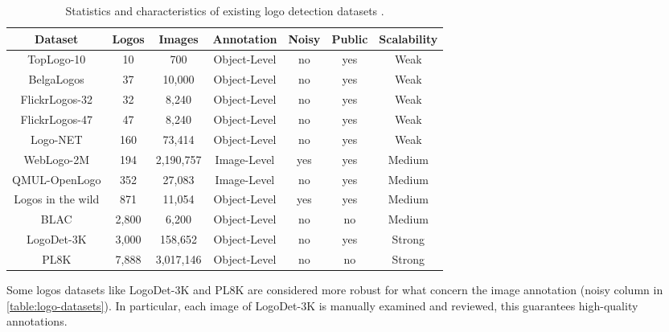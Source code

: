 \begin{table}
    \begin{center}
        \begin{tabular}{c || c | c | c | c | c |c} 
            \hline
            \textbf{Dataset} & \textbf{Logos} & \textbf{Images} & \textbf{Annotation} & \textbf{Noisy} & \textbf{Public} & \textbf{Scalability} \\
            \hline
            \hline
            TopLogo-10 \cite{su2017deep} & 10 & 700 & Object-Level & no & yes & Weak \\ 
       \hline
           BelgaLogos \cite{joly2009logo} & 37 & 10,000 & Object-Level & no & yes & Weak \\ 
       \hline
           FlickrLogos-32 \cite{romberg2011scalable} & 32 & 8,240 & Object-Level & no & yes & Weak \\ 
       \hline
           FlickrLogos-47 \cite{romberg2011scalable} & 47 & 8,240 & Object-Level & no & yes & Weak \\ 
       \hline
           Logo-NET \cite{hoi2015logo} & 160 & 73,414 & Object-Level & no & yes & Weak \\ 
       \hline
           WebLogo-2M \cite{su2017weblogo} & 194 & 2,190,757 & Image-Level & yes & yes & Medium \\ 
       \hline
           QMUL-OpenLogo \cite{su2018open} & 352 & 27,083 & Image-Level & no & yes & Medium \\ 
       \hline
           Logos in the wild \cite{tuzko2017open} & 871 & 11,054 & Object-Level & yes & yes & Medium \\ 
       \hline
           BLAC \cite{bastan2019large} & 2,800 & 6,200 & Object-Level & no & no & Medium \\ 
       \hline
           LogoDet-3K \cite{wang2022logodet} & 3,000 & 158,652 & Object-Level & no & yes & Strong \\ 
       \hline
           PL8K \cite{li2022seetek} & 7,888 & 3,017,146 & Object-Level & no & no & Strong \\ 
           \hline
       
           \end{tabular}
    \end{center}
    
    \caption{Statistics and characteristics of existing logo detection datasets \cite{li2022seetek}.}
    \label{table:logo-datasets}
\end{table}

Some logos datasets like LogoDet-3K and PL8K are considered more robust for what concern the image annotation (noisy column in \autoref{table:logo-datasets}). In particular, each image of LogoDet-3K is manually examined and
reviewed, this guarantees high-quality annotations.

